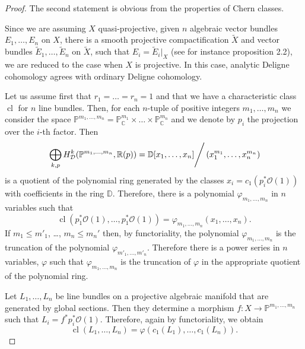 \documentclass[10pt,twoside]{article}
\numberwithin{equation}{section}
\theoremstyle{plain}
\theoremstyle{definition}
\DeclareMathOperator{\cl}{cl}
\begin{document}
\begin{proof}
  The second statement is obvious from the properties of Chern
  classes. 

  Since we are assuming $X$ quasi-projective, given $n$ algebraic
  vector bundles $E_{1}, \dots ,E_{n}$ on $X$, there is a 
  smooth projective compactification $\widetilde X$ and vector bundles
  $\widetilde E_{1},\dots ,\widetilde E_{n}$ on $\widetilde X$, such
  that $E_{i}=\widetilde E_{i}|_{X}$ (see for instance
  \cite{BurgosWang:hBC} proposition 2.2), we are reduced to the case when
  $X$ is projective. In this case, analytic
  Deligne cohomology agrees with ordinary Deligne cohomology.

  Let us assume first that $r_{1}=\dots =r_{n}=1$ and that we have a
  characteristic class $\cl$ for $n$ line bundles. Then, for each
  $n$-tuple of positive integers $m_{1},\dots ,m_{n}$ we consider the
  space $\mathbb{P}^{m_{1},\dots
    ,m_{n}}=\mathbb{P}^{m_{1}}_{\mathbb{C}}\times \dots \times 
  \mathbb{P}^{m_{n}}_{\mathbb{C}}$ and we denote by $p_{i}$ the projection over
  the $i$-th factor. Then 
  $$\left.
  \bigoplus
  _{k,p}H^{k}_{\mathcal{D}}(\mathbb{P}^{m_{1},\dots
    ,m_{n}},\mathbb{R}(p))=\mathbb{D}[x_{1},\dots ,x_{n}]
  \right/
  (x_{1}^{m_{1}},\dots ,x_{n}^{m_{n}})
  $$ 
  is a quotient of the 
  polynomial ring generated by the classes
  $x_{i}=c_{1}(p_{i}^{\ast}\mathcal{O}(1))$ with coefficients in the
  ring $\mathbb{D}$.
  Therefore, there is a
  polynomial $\varphi_{m_{1},\dots ,m_{n}}$ in $n$ variables such that 
  \begin{displaymath}
    \cl(p_{1}^{\ast}\mathcal{O}(1),\dots ,p_{1}^{\ast}\mathcal{O}(1))=
    \varphi_{m_{1},\dots ,m_{n}}(x_{1},\dots ,x_{n}).
  \end{displaymath}
  If $m_{1}\le m'_{1}$, \dots , $m_{n}\le m_{n}'$ then, by
  functoriality, the polynomial $\varphi_{m_{1},\dots ,m_{n}}$
  is the truncation of the polynomial $\varphi_{m'_{1},\dots
    ,m'_{n}}$. Therefore there is a power series in $n$ variables,
  $\varphi $ such that $\varphi_{m_{1},\dots ,m_{n}}$ is the truncation
  of $\varphi $ in the appropriate quotient of the polynomial ring. 

  Let
  $L_{1}, \dots ,L_{n}$ be line bundles on a 
  projective algebraic manifold that are generated by global
  sections. Then they determine a morphism $f\colon X\longrightarrow
  \mathbb{P}^{m_{1},\dots ,m_{n}}$ such that
  $L_{i}=f^{\ast}p^{\ast}_{i}\mathcal{O}(1)$. Therefore, again by
  functoriality, we obtain
  \begin{displaymath}
    \cl(L_{1},\dots ,L_{n})=
    \varphi(c_{1}(L_{1}),\dots ,c_{1}(L_{n})).
  \end{displaymath}
 

\end{proof}
\end{document}
